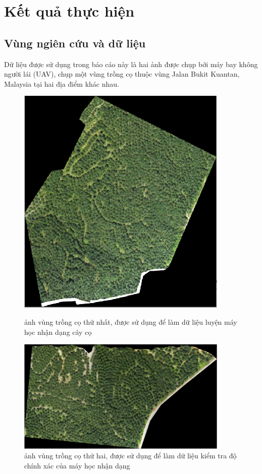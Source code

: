 \documentclass[14pt, oneside, a4paper, openany]{scrartcl}
\begin{document}
\newpage
\section{Kết quả thực hiện}
\subsection{Vùng ngiên cứu và dữ liệu}
Dữ liệu được sử dụng trong báo cáo này là hai ảnh được chụp bởi máy bay không người lái (UAV), chụp một vùng trồng cọ thuộc vùng Jalan Bukit Kuantan, Malaysia tại hai địa điểm khác nhau.
\begin{figure}[!h]
	\centering
	\begin{minipage}{0.7\textwidth}
		\centering
		\includegraphics[width=0.9\textwidth]{figures/data02.png} %
		\caption[ảnh vùng trồng cọ thứ nhất]{ảnh vùng trồng cọ thứ nhất, được sử dụng để làm dữ liệu luyện máy học nhận dạng cây cọ}
	\end{minipage}\hfill
	\begin{minipage}{0.7\textwidth}
		\centering
		\includegraphics[width=0.9\textwidth]{figures/data01.png} %
		\caption[ảnh vùng trồng cọ thứ hai]{ảnh vùng trồng cọ thứ hai, được sử dụng để làm dữ liệu kiểm tra độ chính xác của máy học nhận dạng}
	\end{minipage}
\end{figure}
\end{document}
